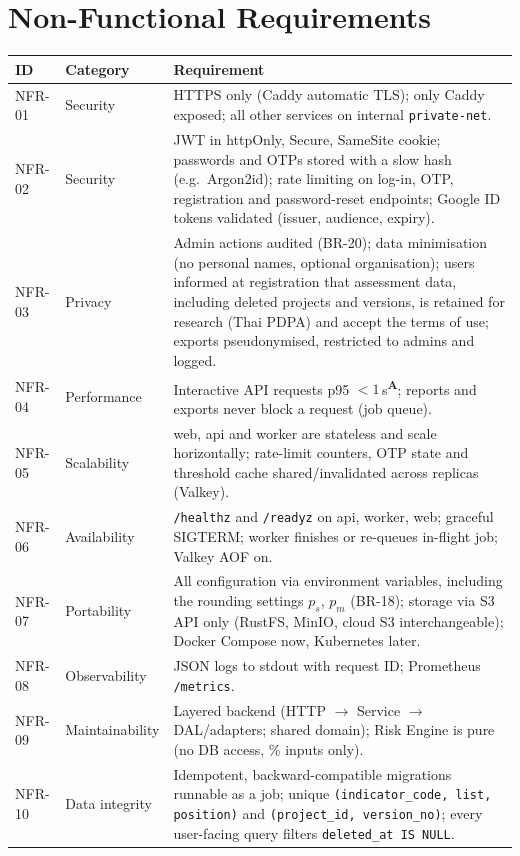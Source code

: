 \documentclass[11pt,a4paper]{article}
\newcommand{\assume}{\textsuperscript{\textcolor{orange!80!black}{\textbf{A}}}}
\begin{document}
\section{Non-Functional Requirements}
\begin{longtable}{@{}l l R{12.2cm}@{}}
\toprule
{}ID & Category & Requirement \\
\midrule
\endhead
NFR-01 & Security & HTTPS only (Caddy automatic TLS); only Caddy exposed; all other services on internal \texttt{private-net}. \\
NFR-02 & Security & JWT in httpOnly, Secure, SameSite cookie; passwords and OTPs stored with a slow hash (e.g.\ Argon2id); rate limiting on log-in, OTP, registration and password-reset endpoints; Google ID tokens validated (issuer, audience, expiry). \\
NFR-03 & Privacy & Admin actions audited (BR-20); data minimisation (no personal names, optional organisation); users informed at registration that assessment data, including deleted projects and versions, is retained for research (Thai PDPA) and accept the terms of use; exports pseudonymised, restricted to admins and logged. \\
NFR-04 & Performance & Interactive API requests p95 $< 1$\,s\assume; reports and exports never block a request (job queue). \\
NFR-05 & Scalability & web, api and worker are stateless and scale horizontally; rate-limit counters, OTP state and threshold cache shared/invalidated across replicas (Valkey). \\
NFR-06 & Availability & \texttt{/healthz} and \texttt{/readyz} on api, worker, web; graceful SIGTERM; worker finishes or re-queues in-flight job; Valkey AOF on. \\
NFR-07 & Portability & All configuration via environment variables, including the rounding settings $p_s$, $p_m$ (BR-18); storage via S3 API only (RustFS, MinIO, cloud S3 interchangeable); Docker Compose now, Kubernetes later. \\
NFR-08 & Observability & JSON logs to stdout with request ID; Prometheus \texttt{/metrics}. \\
NFR-09 & Maintainability & Layered backend (HTTP $\to$ Service $\to$ DAL/adapters; shared domain); Risk Engine is pure (no DB access, \% inputs only). \\
NFR-10 & Data integrity & Idempotent, backward-compatible migrations runnable as a job; unique \texttt{(indicator\_code, list, position)} and \texttt{(project\_id, version\_no)}; every user-facing query filters \texttt{deleted\_at IS NULL}. \\

\end{longtable}
\end{document}
